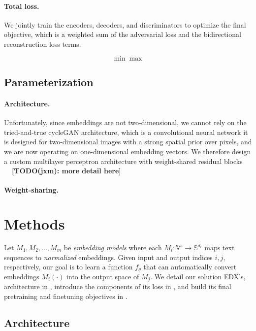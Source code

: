 \paragraph{Total loss.} We jointly train the encoders, decoders, and discriminators to optimize the final objective, which is a weighted sum of the adversarial loss and the
bidirectional reconstruction loss terms.


\[
\min \max
\]

\subsection{Parameterization}


\paragraph{Architecture.} Unfortunately, since embeddings are not two-dimensional, we cannot rely on the tried-and-true cycleGAN architecture, which is a convolutional neural network it is designed for two-dimensional images with a strong spatial prior over pixels, and we are now operating on one-dimensional embedding vectors. We therefore design a custom multilayer perceptron architecture with weight-shared residual blocks \textbf{\color{purple}\ \ [TODO(jxm): more detail here]}

\paragraph{Weight-sharing.}


\section{Methods}


Let $M_1, M_2, ..., M_m$ be \textit{embedding models} where each $M_i: \mathbb{V}^s \rightarrow \mathbb{S}^{d_i}$ maps text sequences to \textit{normalized} embeddings. Given input and output indices $i, j$, respectively, our goal is to learn a function $f_{\theta}$ that can automatically convert embeddings $M_i(\cdot)$ into the output space of $M_j$. We detail our solution EDX's, architecture in , introduce the components of its loss in , and build its final pretraining and finetuning objectives in .

\subsection{Architecture}\label{sec:architecture}

